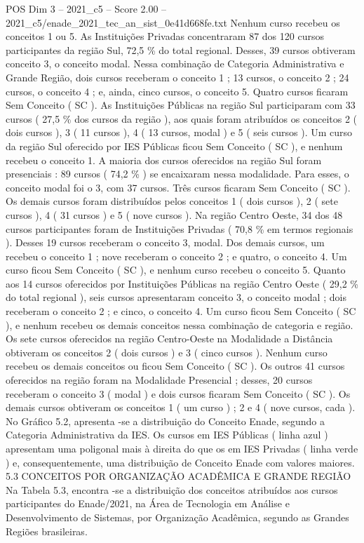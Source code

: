 \begin{textsample}{POS Dim 3 – 2021\_c5 – Score 2.00 – 2021\_c5/enade\_2021\_tec\_an\_sist\_0e41d668fe.txt}
Nenhum curso recebeu os conceitos 1 ou 5.
As Instituições Privadas concentraram 87 dos 120 cursos participantes da região Sul, 72,5 \% do total regional.
Desses, 39 cursos obtiveram conceito 3, o conceito modal.
Nessa combinação de Categoria Administrativa e Grande Região, dois cursos receberam o conceito 1 ; 13 cursos, o conceito 2 ; 24 cursos, o conceito 4 ; e, ainda, cinco cursos, o conceito 5.
Quatro cursos ficaram Sem Conceito ( SC ).
As Instituições Públicas na região Sul participaram com 33 cursos ( 27,5 \% dos cursos da região ), aos quais foram atribuídos os conceitos 2 ( dois cursos ), 3 ( 11 cursos ), 4 ( 13 cursos, modal ) e 5 ( seis cursos ).
Um curso da região Sul oferecido por IES Públicas ficou Sem Conceito ( SC ), e nenhum recebeu o conceito 1.
A maioria dos cursos oferecidos na região Sul foram presenciais : 89 cursos ( 74,2 \% ) se encaixaram nessa modalidade.
Para esses, o conceito modal foi o 3, com 37 cursos.
Três cursos ficaram Sem Conceito ( SC ).
Os demais cursos foram distribuídos pelos conceitos 1 ( dois cursos ), 2 ( sete cursos ), 4 ( 31 cursos ) e 5 ( nove cursos ).
Na região Centro Oeste, 34 dos 48 cursos participantes foram de Instituições Privadas ( 70,8 \% em termos regionais ).
Desses 19 cursos receberam o conceito 3, modal.
Dos demais cursos, um recebeu o conceito 1 ; nove receberam o conceito 2 ; e quatro, o conceito 4.
Um curso ficou Sem Conceito ( SC ), e nenhum curso recebeu o conceito 5.
Quanto aos 14 cursos oferecidos por Instituições Públicas na região Centro Oeste ( 29,2 \% do total regional ), seis cursos apresentaram conceito 3, o conceito modal ; dois receberam o conceito 2 ; e cinco, o conceito 4.
Um curso ficou Sem Conceito ( SC ), e nenhum recebeu os demais conceitos nessa combinação de categoria e região.
Os sete cursos oferecidos na região Centro-Oeste na Modalidade a Distância obtiveram os conceitos 2 ( dois cursos ) e 3 ( cinco cursos ).
Nenhum curso recebeu os demais conceitos ou ficou Sem Conceito ( SC ).
Os outros 41 cursos oferecidos na região foram na Modalidade Presencial ; desses, 20 cursos receberam o conceito 3 ( modal ) e dois cursos ficaram Sem Conceito ( SC ).
Os demais cursos obtiveram os conceitos 1 ( um curso ) ; 2 e 4 ( nove cursos, cada ).
No Gráfico 5.2, apresenta -se a distribuição do Conceito Enade, segundo a Categoria Administrativa da IES.
Os cursos em IES Públicas ( linha azul ) apresentam uma poligonal mais à direita do que os em IES Privadas ( linha verde ) e, consequentemente, uma distribuição de Conceito Enade com valores maiores. 5.3 CONCEITOS POR ORGANIZAÇÃO ACADÊMICA E GRANDE REGIÃO Na Tabela 5.3, encontra -se a distribuição dos conceitos atribuídos aos cursos participantes do Enade/2021, na Área de Tecnologia em Análise e Desenvolvimento de Sistemas, por Organização Acadêmica, segundo as Grandes Regiões brasileiras.

\end{textsample}
